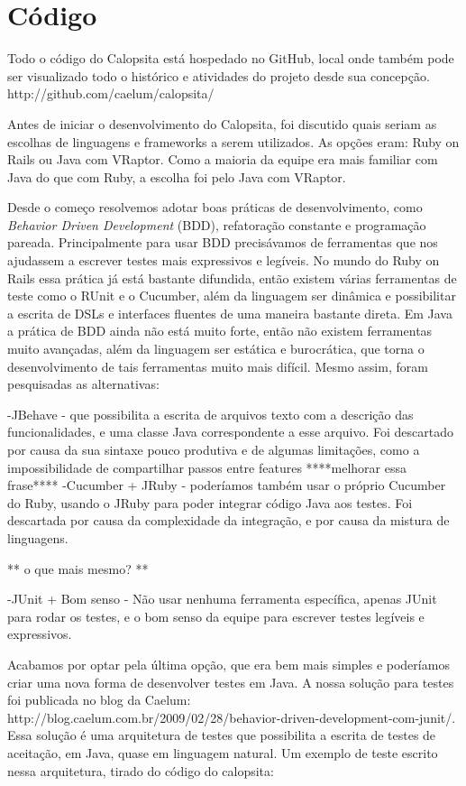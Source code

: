 \section{Código}
Todo o código do Calopsita está hospedado no GitHub, local onde também pode ser visualizado todo o histórico e atividades do projeto desde sua concepção. http://github.com/caelum/calopsita/

Antes de iniciar o desenvolvimento do Calopsita, foi discutido quais seriam as escolhas de linguagens e frameworks a serem utilizados. As opções eram: Ruby on Rails ou Java com VRaptor. Como a maioria da equipe era mais familiar com Java do que com Ruby, a escolha foi pelo Java com VRaptor.

Desde o começo resolvemos adotar boas práticas de desenvolvimento, como {\it Behavior Driven Development} (BDD), refatoração constante e programação pareada. Principalmente para usar BDD precisávamos de ferramentas que nos ajudassem a escrever testes mais expressivos e legíveis. No mundo do Ruby on Rails essa prática já está bastante difundida, então existem várias ferramentas de teste como o RUnit e o Cucumber, além da linguagem ser dinâmica e possibilitar a escrita de DSLs e interfaces fluentes de uma maneira bastante direta. Em Java a prática de BDD ainda não está muito forte, então não existem ferramentas muito avançadas, além da linguagem ser estática e burocrática, que torna o desenvolvimento de tais ferramentas muito mais difícil. Mesmo assim, foram pesquisadas as alternativas:

-JBehave - que possibilita a escrita de arquivos texto com a descrição das funcionalidades, e uma classe Java correspondente a esse arquivo. Foi descartado por causa da sua sintaxe pouco produtiva e de algumas limitações, como a impossibilidade de compartilhar passos entre features ****melhorar essa frase****
-Cucumber + JRuby - poderíamos também usar o próprio Cucumber do Ruby, usando o JRuby para poder integrar código Java aos testes. Foi descartada por causa da complexidade da integração, e por causa da mistura de linguagens.

** o que mais mesmo? **

-JUnit + Bom senso - Não usar nenhuma ferramenta específica, apenas JUnit para rodar os testes, e o bom senso da equipe para escrever testes legíveis e expressivos.

Acabamos por optar pela última opção, que era bem mais simples e poderíamos criar uma nova forma de desenvolver testes em Java. A nossa solução para testes foi publicada no blog da Caelum: http://blog.caelum.com.br/2009/02/28/behavior-driven-development-com-junit/. Essa solução é uma arquitetura de testes que possibilita a escrita de testes de aceitação, em Java, quase em linguagem natural. Um exemplo de teste escrito nessa arquitetura, tirado do código do calopsita:

